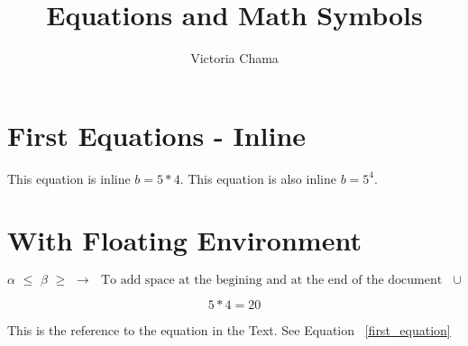 \documentclass{article}
\title{Equations and Math Symbols}
\author{Victoria Chama}
\begin{document}
	\maketitle
	
	\section{First Equations - Inline}
	
	This equation is inline $b = 5*4$.
	This equation is also inline $b = 5^4$.
	
	\section{With Floating Environment}
	

	\begin{equation}
	\label{first_equation}
	\alpha \,\, \leq  \,\, \beta \,\, \geq \,\, \rightarrow \,\, \text{ To add space at the begining and at the end of the document } \,\, \cup 
	\end{equation}
	
	
	\begin{equation*}
	5*4 = 20
	\end{equation*}
	
	This is the reference to the equation in the Text. See Equation ~\ref{first_equation}
	
\end{document}
